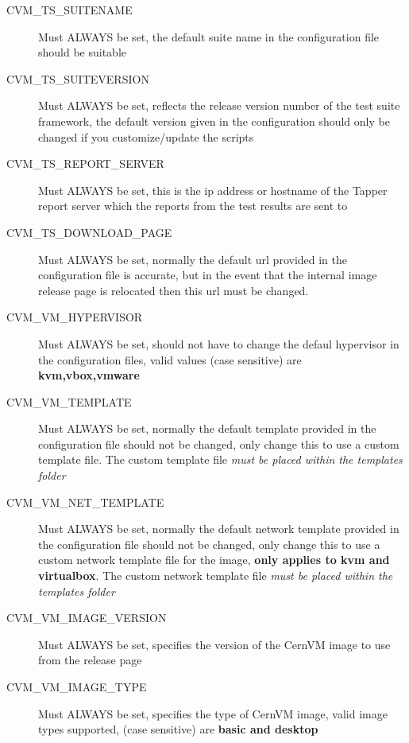 \begin{enumerate}
\begin{description}
\item[CVM\_TS\_SUITENAME]	Must ALWAYS be set, the default suite name in the configuration file should be suitable

	  		  
\item[CVM\_TS\_SUITEVERSION] 	Must ALWAYS be set, reflects the release version number of the test suite framework, the  default
								version given in the configuration should only be changed if you customize/update the scripts

\item[CVM\_TS\_REPORT\_SERVER]	Must ALWAYS be set, this is the ip address or hostname of the Tapper report server which the reports
      							from the test results are sent to
		
\item[CVM\_TS\_DOWNLOAD\_PAGE]	Must ALWAYS be set, normally the default url provided in the configuration file is accurate, but in the
								event that the internal \cernvm image release page is relocated then this url must be changed.

\item[CVM\_VM\_HYPERVISOR]	Must ALWAYS be set, should not have to change the defaul hypervisor in the configuration files, valid values 
							(case sensitive) are {\bf kvm,vbox,vmware}

\item[CVM\_VM\_TEMPLATE]		Must ALWAYS be set, normally the default template provided in the configuration file should not be changed,
								only change this to use a custom template file. The custom template file \emph{must be placed within the
								templates folder}

\item[CVM\_VM\_NET\_TEMPLATE]	Must ALWAYS be set, normally the default network template provided in the configuration file should not be
	 							changed, only change this to use a custom network template file for the \cernvm image,  {\bf only applies to kvm
	 							and virtualbox}. The custom network template file \emph{must be placed within the templates folder}

\item[CVM\_VM\_IMAGE\_VERSION]	Must ALWAYS be set, specifies the version of the CernVM image to use from the release page
	
\item[CVM\_VM\_IMAGE\_TYPE]		Must ALWAYS be set,  specifies the type of CernVM image, valid image types supported, (case sensitive) are 
								{\bf basic and desktop}


\end{description}
\end{enumerate}

